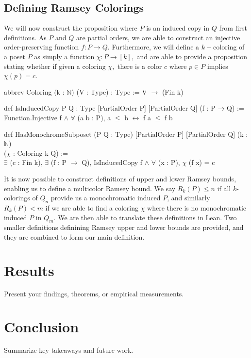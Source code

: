 \documentclass[11pt,letterpaper]{article}
\newenvironment{code}
  {\par\medskip\ttfamily}
  {\par\medskip}
\begin{document}
\subsection{Defining Ramsey Colorings}

We will now construct the proposition where $P$ is an induced copy in $Q$ from first definitions. As $P$ and $Q$ are partial orders, we are able to construct an injective order-preserving function $f : P \to Q.$ Furthermore, we will define a $k-$coloring of a poset $P$ as simply a function $\chi : P \to [k],$ and are able to provide a proposition stating whether if given a coloring $\chi,$ there is a color $c$ where $p \in P$ implies $\chi(p) = c.$
\begin{code}
abbrev Coloring (k : $\mathbb N$) (V : Type) : Type := V $\to$ (Fin k)

def IsInducedCopy {P Q : Type} [PartialOrder P] [PartialOrder Q] (f : P → Q) := \\
  Function.Injective f $\wedge$ $\forall$ (a b : P), a $\leq$ b $\leftrightarrow$ f a $\leq$ f b


  def HasMonochromeSubposet (P Q : Type) [PartialOrder P] [PartialOrder Q] (k : $\mathbb N$) \\
    ($\chi$ : Coloring k Q) := \\
  $\exists$ (c : Fin k), $\exists$ (f : P $\to$ Q), IsInducedCopy f $\wedge$ $\forall$ (x : P), $\chi$ (f x) = c
  
\end{code}

It is now possible to construct definitions of upper and lower Ramsey bounds, enabling us to define a multicolor Ramsey bound. We say $R_k(P) \leq n$ if all $k$-colorings of $Q_n$ provide us a monochromatic induced $P$, and similarly $R_k(P) < m$ if we are able to find a coloring $\chi$ where there is no monochromatic induced $P$ in $Q_m.$ We are then able to translate these definitions in Lean. Two smaller definitions definining Ramsey upper and lower bounds are provided, and they are combined to form our main definition.


\section{Results}
Present your findings, theorems, or empirical measurements.

\section{Conclusion}
Summarize key takeaways and future work.



\end{document}
